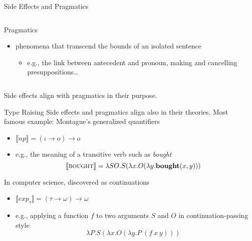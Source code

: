 \documentclass{beamer}
\newcommand{\sem}[1]{\llbracket #1 \rrbracket}
\newcommand{\semdom}[1]{\textbf{#1}}
\begin{document}
\begin{frame}{Side Effects and Pragmatics}
\begin{columns}
\begin{column}{0.5\textwidth}
\begin{block}{Pragmatics}
\begin{itemize}
\begin{itemize}
          \end{itemize}
        \pause \vfill
        \item phenomena that transcend the bounds of an isolated sentence
          \begin{itemize}
          \item e.g., the link between antecedent and pronoun, making and
            cancelling presuppositions\ldots
          \end{itemize}
        \end{itemize}
      \end{block}
    \end{column}
  \end{columns}
  \vfill
  \pause
  \alert{Side effects align with pragmatics in their purpose.}
\end{frame}


\begin{frame}{Type Raising}
  Side effects and pragmatics align also in their theories.
  \pause
  \vfill
  Most famous example: Montague's generalized quantifiers
  \begin{itemize}
  \item $\sem{np} = (\iota \to o) \to o$
  \item e.g., the meaning of a transitive verb such as \textit{bought}
    $$ \sem{\textsc{bought}} = \lambda S O. S (\lambda x. O (\lambda y. \semdom{bought}(x, y))) $$
  \end{itemize}
  \vfill
  \pause
  In computer science, discovered as continuations
  \begin{itemize}
  \item $\sem{exp_{\tau}} = (\tau \to \omega) \to \omega$
  \item e.g., applying a function $f$ to two arguments $S$ and $O$ in
    continuation-passing style
    $$ \lambda P. S (\lambda x. O (\lambda y. P\ (f\ x\ y))) $$
  \end{itemize}
\end{frame}
\end{document}
